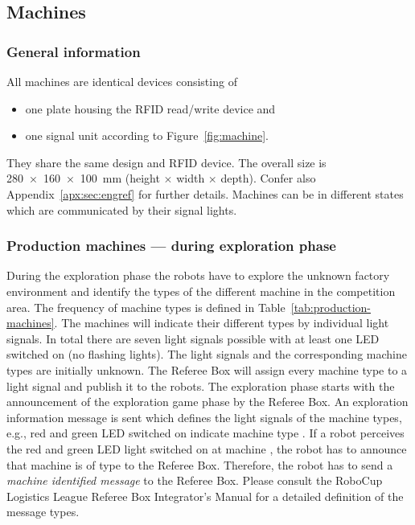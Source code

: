 \documentclass[12pt,twoside]{article}
\begin{document}

\subsection{Machines}
\label{sec:machines}

\subsubsection{General information}
All machines are identical devices consisting of 
\begin{itemize}
\item one plate housing the RFID read/write device and
\item one signal unit according to Figure~\ref{fig:machine}.
\end{itemize}

They share the same design and RFID device. The overall size is
\SI{280 x 160 x 100}{\milli\metre} (height $\times$ width $\times$
depth). Confer also Appendix~\ref{apx:sec:engref} for further
details. Machines can be in different states which are communicated by
their signal lights.

\subsubsection{Production machines --- during exploration phase}
\label{sec:production-machines-exp}
During the exploration phase the robots have to explore the unknown
factory environment and identify the types of the different machine in
the competition area. The frequency of machine types is defined in
Table~\ref{tab:production-machines}. The machines will indicate their
different types by individual light signals. In total there are seven
light signals possible with at least one LED switched on (no flashing
lights). The light signals and the corresponding machine types are
initially unknown. The Referee Box will assign every machine type to a
light signal and publish it to the robots. The exploration phase
starts with the announcement of the exploration game phase by the
Referee Box. An exploration information message is sent which defines
the light signals of the machine types, e.g., red and green LED
switched on indicate machine type . If a robot perceives the red
and green LED light switched on at machine , the robot has to
announce that machine  is of type  to the Referee
Box. Therefore, the robot has to send a \emph{machine identified
  message} to the Referee Box. Please consult the RoboCup Logistics
League Referee Box Integrator's Manual for a detailed definition of the
message types.
\end{document}
